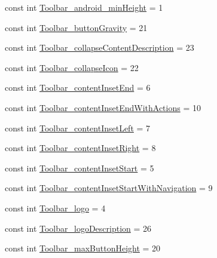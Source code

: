 \begin{DoxyCompactItemize}
\item 
const int \mbox{\hyperlink{class_f_w_p_s___app_1_1_droid_1_1_resource_1_1_styleable_adb19071d3a3d5697aae629cbe1ae6d7d}{Toolbar\+\_\+android\+\_\+min\+Height}} = 1
\item 
const int \mbox{\hyperlink{class_f_w_p_s___app_1_1_droid_1_1_resource_1_1_styleable_a1604f7a7b533e7c7140b09ac4de50c0d}{Toolbar\+\_\+button\+Gravity}} = 21
\item 
const int \mbox{\hyperlink{class_f_w_p_s___app_1_1_droid_1_1_resource_1_1_styleable_a2521d0ab717d3f5b1a455ee382d042d8}{Toolbar\+\_\+collapse\+Content\+Description}} = 23
\item 
const int \mbox{\hyperlink{class_f_w_p_s___app_1_1_droid_1_1_resource_1_1_styleable_a02e3e98a082ad26d46c8113b0ab910cc}{Toolbar\+\_\+collapse\+Icon}} = 22
\item 
const int \mbox{\hyperlink{class_f_w_p_s___app_1_1_droid_1_1_resource_1_1_styleable_a87e646590688de91d7116ee2253e4ad0}{Toolbar\+\_\+content\+Inset\+End}} = 6
\item 
const int \mbox{\hyperlink{class_f_w_p_s___app_1_1_droid_1_1_resource_1_1_styleable_ab2d0ad7daa9473ca0c9d26f85845ca36}{Toolbar\+\_\+content\+Inset\+End\+With\+Actions}} = 10
\item 
const int \mbox{\hyperlink{class_f_w_p_s___app_1_1_droid_1_1_resource_1_1_styleable_a8819a14005cfcb8eb082bd30f93f51a9}{Toolbar\+\_\+content\+Inset\+Left}} = 7
\item 
const int \mbox{\hyperlink{class_f_w_p_s___app_1_1_droid_1_1_resource_1_1_styleable_a171b8aea17a68d11fd2a16fac4c61983}{Toolbar\+\_\+content\+Inset\+Right}} = 8
\item 
const int \mbox{\hyperlink{class_f_w_p_s___app_1_1_droid_1_1_resource_1_1_styleable_a170096ec9eaae94be8bb12c045af61b0}{Toolbar\+\_\+content\+Inset\+Start}} = 5
\item 
const int \mbox{\hyperlink{class_f_w_p_s___app_1_1_droid_1_1_resource_1_1_styleable_ad7c3fa7926b62b12e0aa1503118c67c5}{Toolbar\+\_\+content\+Inset\+Start\+With\+Navigation}} = 9
\item 
const int \mbox{\hyperlink{class_f_w_p_s___app_1_1_droid_1_1_resource_1_1_styleable_a93b78cbae47a575c8276000d5f1af6b1}{Toolbar\+\_\+logo}} = 4
\item 
const int \mbox{\hyperlink{class_f_w_p_s___app_1_1_droid_1_1_resource_1_1_styleable_a50dd9dcd7032fca16655cfb8f466d156}{Toolbar\+\_\+logo\+Description}} = 26
\item 
const int \mbox{\hyperlink{class_f_w_p_s___app_1_1_droid_1_1_resource_1_1_styleable_aef3a758aa9df5d835322cb9ba85a57f0}{Toolbar\+\_\+max\+Button\+Height}} = 20

\end{DoxyCompactItemize}
